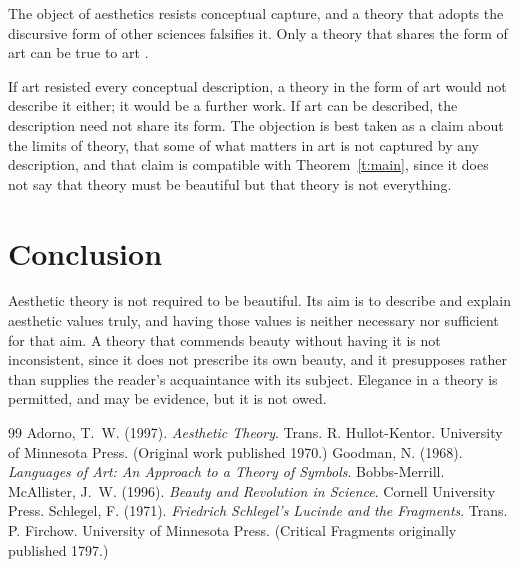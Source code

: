 \documentclass{situationist-preprint}
\begin{document}
\begin{objection}\label{o:adorno}
The object of aesthetics resists conceptual capture, and a theory that adopts the discursive form of other sciences falsifies it. Only a theory that shares the form of art can be true to art \citep{Adorno1997,Schlegel1971}.
\end{objection}

\begin{reply}
If art resisted every conceptual description, a theory in the form of art would not describe it either; it would be a further work. If art can be described, the description need not share its form. The objection is best taken as a claim about the limits of theory, that some of what matters in art is not captured by any description, and that claim is compatible with Theorem~\ref{t:main}, since it does not say that theory must be beautiful but that theory is not everything.
\end{reply}

\section{Conclusion}

Aesthetic theory is not required to be beautiful. Its aim is to describe and explain aesthetic values truly, and having those values is neither necessary nor sufficient for that aim. A theory that commends beauty without having it is not inconsistent, since it does not prescribe its own beauty, and it presupposes rather than supplies the reader's acquaintance with its subject. Elegance in a theory is permitted, and may be evidence, but it is not owed.

\begin{thebibliography}{99}\small
{} Adorno, T.~W. (1997). \emph{Aesthetic Theory}. Trans. R. Hullot-Kentor. University of Minnesota Press. (Original work published 1970.)
 Goodman, N. (1968). \emph{Languages of Art: An Approach to a Theory of Symbols}. Bobbs-Merrill.
 McAllister, J.~W. (1996). \emph{Beauty and Revolution in Science}. Cornell University Press.
 Schlegel, F. (1971). \emph{Friedrich Schlegel's Lucinde and the Fragments}. Trans. P. Firchow. University of Minnesota Press. (Critical Fragments originally published 1797.)
\end{thebibliography}
\end{document}
